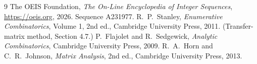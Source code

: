 \documentclass[11pt,a4paper]{article}
\theoremstyle{plain}
\theoremstyle{definition}
\begin{document}
\begin{thebibliography}{9}
 The OEIS Foundation, \emph{The On-Line Encyclopedia of Integer
Sequences}, \url{https://oeis.org}, 2026. Sequence A231977.
 R.~P.~Stanley, \emph{Enumerative Combinatorics}, Volume 1, 2nd ed.,
Cambridge University Press, 2011. (Transfer-matrix method, Section 4.7.)
 P.~Flajolet and R.~Sedgewick, \emph{Analytic Combinatorics}, Cambridge
University Press, 2009.
 R.~A.~Horn and C.~R.~Johnson, \emph{Matrix Analysis}, 2nd ed., Cambridge
University Press, 2013.
\end{thebibliography}
\end{document}
